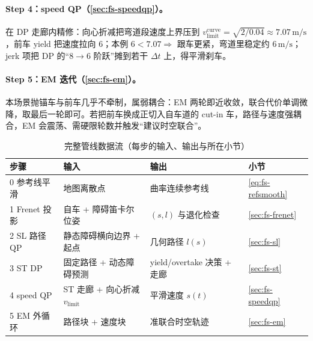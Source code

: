 \paragraph{Step 4：speed QP（\cref{sec:fs-speedqp}）。}
在 DP 走廊内精修：向心折减把弯道段速度上界压到 $v_{\mathrm{limit}}^{\mathrm{curve}}=\sqrt{2/0.04}\approx7.07\,\mathrm{m/s}$，前车 yield 把速度拉向 $6$；本例 $6<7.07\Rightarrow$ 跟车更紧，弯道里稳定约 $6\,\mathrm{m/s}$；jerk 项把 DP 的“$8\to6$ 阶跃”摊到若干 $\Delta t$ 上，得平滑刹车。

\paragraph{Step 5：EM 迭代（\cref{sec:fs-em}）。}
本场景抛锚车与前车几乎不牵制，属弱耦合：EM 两轮即近收敛，联合代价单调微降，取最后一轮即可。若把前车换成正切入自车道的 cut-in 车，路径与速度强耦合，EM 会震荡、需硬限轮数并触发“建议时空联合”。

\begin{table}[H]\centering\small
\caption{完整管线数据流（每步的输入、输出与所在小节）}
\label{tab:fs-pipeline}
\begin{tabular}{llll}
\toprule
步骤 & 输入 & 输出 & 小节 \\
\midrule
0 参考线平滑 & 地图离散点 & 曲率连续参考线 & \cref{eq:fs-refsmooth} \\
1 Frenet 投影 & 自车 + 障碍笛卡尔位姿 & $(s,l)$ 与退化检查 & \cref{sec:fs-frenet} \\
2 SL 路径 QP & 静态障碍横向边界 + 起点 & 几何路径 $l(s)$ & \cref{sec:fs-sl} \\
3 ST DP & 固定路径 + 动态障碍预测 & yield/overtake 决策 + 走廊 & \cref{sec:fs-st} \\
4 speed QP & ST 走廊 + 向心折减 $v_{\mathrm{limit}}$ & 平滑速度 $s(t)$ & \cref{sec:fs-speedqp} \\
5 EM 外循环 & 路径块 + 速度块 & 准联合时空轨迹 & \cref{sec:fs-em} \\
\bottomrule
\end{tabular}
\end{table}

